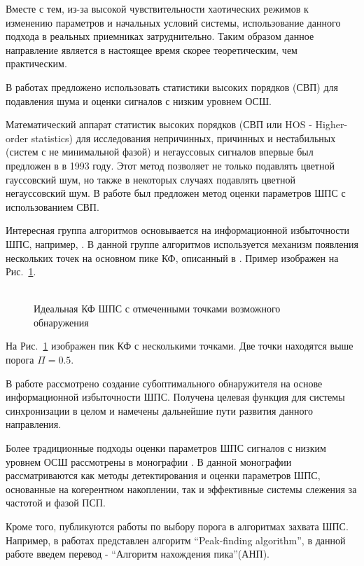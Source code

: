 Вместе с тем, из-за высокой чувствительности хаотических режимов к изменению параметров и начальных условий системы, использование данного подхода
в реальных приемниках затруднительно. Таким образом данное направление является в настоящее время скорее теоретическим, чем практическим.

В работах \cite{hos_petropulu, hos_zhao} предложено использовать статистики высоких порядков (СВП) для подавления шума и оценки
сигналов с низким уровнем ОСШ.

Математический аппарат статистик высоких порядков (СВП или HOS - Higher-order statistics)
для исследования непричинных, причинных и нестабильных
(систем с не минимальной фазой) и негауссовых сигналов впервые был предложен в \cite{hos_petropulu} в 1993 году.
Этот метод позволяет не только подавлять цветной гауссовский шум, но также в некоторых случаях подавлять
цветной негауссовский шум. В работе \cite{hos_zhao} был предложен метод оценки параметров ШПС с использованием СВП.

Интересная группа алгоритмов основывается на информационной избыточности ШПС, например, \cite{phd_che}. В данной
группе алгоритмов используется механизм появления нескольких точек на основном пике КФ, описанный в \cite{kaplan}. Пример
изображен на \mbox{Рис. \ref{pic:sec1_peak_tcd}}.
\begin{figure}[h]
	\center{}
	\caption{\\Идеальная КФ ШПС с отмеченными точками возможного обнаружения}
	\label{pic:sec1_peak_tcd}
\end{figure}

На \mbox{Рис. \ref{pic:sec1_peak_tcd}} изображен пик КФ с несколькими точками. Две точки находятся выше порога ${\Pi=0.5}$.

В работе \cite{phd_che} рассмотрено создание субоптимального обнаружителя на основе информационной избыточности ШПС.
Получена целевая функция для системы синхронизации в целом и намечены дальнейшие пути развития данного направления.

Более традиционные подходы оценки параметров ШПС сигналов с низким уровнем ОСШ рассмотрены в монографии \cite{ziedan-book}.
В данной монографии рассматриваются как методы детектирования и оценки параметров ШПС, основанные на когерентном накоплении, так и эффективные
системы слежения за частотой и фазой ПСП.

Кроме того, публикуются работы по выбору порога в алгоритмах захвата ШПС. Например, в работах \cite{2max_ieee, 2max_article} представлен алгоритм
\textquotedblleft{Peak-finding algorithm}\textquotedblright,
в данной работе введем перевод -
\textquotedblleft{Алгоритм нахождения пика}\textquotedblright (АНП). 


